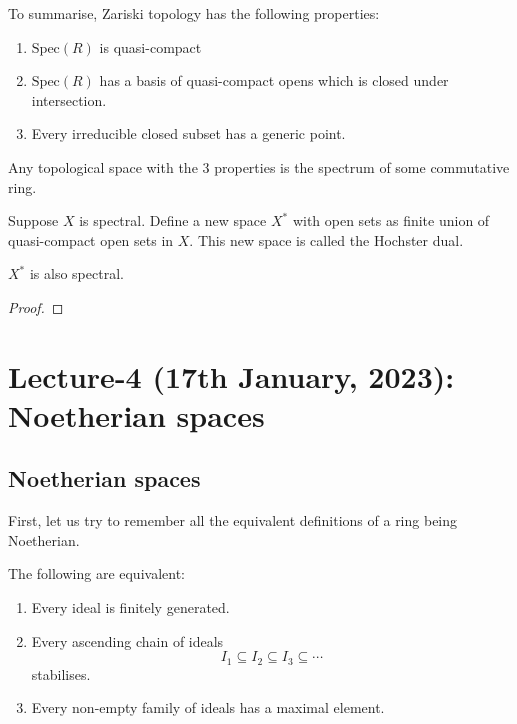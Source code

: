 \documentclass[oneside, 12pt, ]{scrbook}
\newcommand{\spec}{\mathrm{Spec}}
\theoremstyle{theorem}
\begin{document}
To summarise, Zariski topology has the following properties: 
\begin{enumerate}
\item $\spec(R)$ is quasi-compact
\item $\spec(R)$ has a basis of quasi-compact opens which is closed under intersection.
\item Every irreducible closed subset has a generic point.
\end{enumerate}

\begin{theorem}[Hochster]
Any topological space with the $3$ properties is the spectrum of some commutative ring.
\end{theorem}



Suppose $X$ is spectral. Define a new space $X^{*}$ with open sets as finite union of quasi-compact open sets in $X$. This new space is called the Hochster dual.

\begin{theorem}
$X^{*}$ is also spectral.
\end{theorem} 

\begin{proof}

\end{proof}


\chapter{Lecture-4 (17th January, 2023): Noetherian spaces}

\section{Noetherian spaces}

First, let us try to remember all the equivalent definitions of a ring being Noetherian. 

\begin{proposition}
The following are equivalent:
\begin{enumerate}
\item Every ideal is finitely generated. 
\item Every ascending chain of ideals $$I_{1} \subseteq I_{2} \subseteq I_{3} \subseteq \cdots $$ stabilises. 
\item Every non-empty family of ideals has a maximal element. 
\end{enumerate}
\end{proposition}
\end{document}
